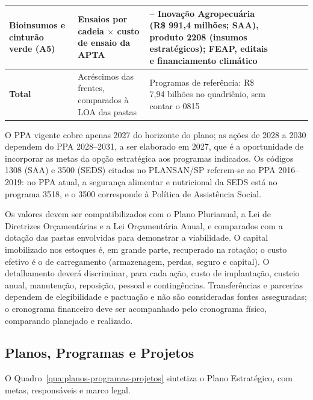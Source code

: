 \documentclass[
	12pt,				%
	openright,			%
	oneside,			%
	a4paper,			%
	chapter=TITLE,		%
	section=TITLE,		%
	english,			%
	french,				%
	spanish,			%
	brazil,				%
 ]{abntex2}
\begin{document}
\begin{quadro}[!htbp]
\begin{tabularx}{\textwidth}{|>{\raggedright\arraybackslash}p{2.2cm}|>{\raggedright\arraybackslash}p{3.6cm}|>{\raggedright\arraybackslash}X|c|c|c|c|}
\hline
Bioinsumos e cinturão verde (A5) & Ensaios por cadeia $\times$ custo de ensaio da APTA & 1319 -- Inovação Agropecuária (R\$ 991,4 milhões; SAA), produto 2208 (insumos estratégicos); FEAP, editais e financiamento climático & \cellcolor{gray!20} & \cellcolor{gray!45} & \cellcolor{gray!45} & \cellcolor{gray!20} \\
\hline
\textbf{Total} & Acréscimos das frentes, comparados à LOA das pastas & Programas de referência: R\$ 7,94 bilhões no quadriênio, sem contar o 0815 & & & & \\
\hline
\end{tabularx}
\end{quadro}

O PPA vigente cobre apenas 2027 do horizonte do plano; as ações de 2028 a 2030
dependem do PPA 2028--2031, a ser elaborado em 2027, que é a oportunidade de
incorporar as metas da opção estratégica aos programas indicados. Os códigos
1308 (SAA) e 3500 (SEDS) citados no PLANSAN/SP referem-se ao PPA 2016--2019: no
PPA atual, a segurança alimentar e nutricional da SEDS está no programa 3518, e o
3500 corresponde à Política de Assistência Social.

Os valores devem ser compatibilizados com o Plano Plurianual, a Lei de
Diretrizes Orçamentárias e a Lei Orçamentária Anual, e comparados com a dotação
das pastas envolvidas para demonstrar a viabilidade.
O capital imobilizado nos estoques é, em grande parte, recuperado na rotação;
o custo efetivo é o de carregamento (armazenagem, perdas, seguro e capital). O
detalhamento deverá discriminar, para cada ação, custo de implantação, custeio
anual, manutenção, reposição, pessoal e contingências. Transferências e parcerias
dependem de elegibilidade e pactuação e não são consideradas fontes asseguradas;
o cronograma financeiro deve ser acompanhado pelo cronograma físico, comparando
planejado e realizado.

\subsection{Planos, Programas e Projetos}
O Quadro~\ref{qua:planos-programas-projetos} sintetiza o Plano Estratégico, com
metas, responsáveis e marco legal.
\end{document}
